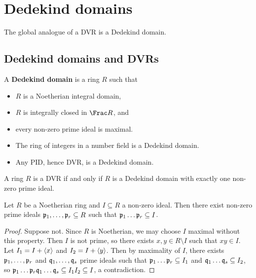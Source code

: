 \pagebreak

\section{Dedekind domains}

The global analogue of a DVR is a Dedekind domain.

\subsection{Dedekind domains and DVRs}

\begin{definition}
A \textbf{Dedekind domain} is a ring $ R $ such that
\begin{itemize}
\item $ R $ is a Noetherian integral domain,
\item $ R $ is integrally closed in $ \Frac R $, and
\item every non-zero prime ideal is maximal.
\end{itemize}
\end{definition}

\begin{example*}
\hfill
\begin{itemize}
\item The ring of integers in a number field is a Dedekind domain.
\item Any PID, hence DVR, is a Dedekind domain.
\end{itemize}
\end{example*}

\begin{theorem}
\label{thm:10.7}
A ring $ R $ is a DVR if and only if $ R $ is a Dedekind domain with exactly one non-zero prime ideal.
\end{theorem}

\begin{lemma}
\label{lem:10.8}
Let $ R $ be a Noetherian ring and $ I \subseteq R $ a non-zero ideal. Then there exist non-zero prime ideals $ \mathfrak{p}_1, \dots, \mathfrak{p}_r \subseteq R $ such that $ \mathfrak{p}_1 \dots \mathfrak{p}_r \subseteq I $.
\end{lemma}

\begin{proof}
Suppose not. Since $ R $ is Noetherian, we may choose $ I $ maximal without this property. Then $ I $ is not prime, so there exists $ x, y \in R \setminus I $ such that $ xy \in I $. Let $ I_1 = I + \left\langle x \right\rangle $ and $ I_2 = I + \left\langle y \right\rangle $. Then by maximality of $ I $, there exists $ \mathfrak{p}_1, \dots, \mathfrak{p}_r $ and $ \mathfrak{q}_1, \dots, \mathfrak{q}_s $ prime ideals such that $ \mathfrak{p}_1 \dots \mathfrak{p}_r \subseteq I_1 $ and $ \mathfrak{q}_1 \dots \mathfrak{q}_s \subseteq I_2 $, so $ \mathfrak{p}_1 \dots \mathfrak{p}_r\mathfrak{q}_1 \dots \mathfrak{q}_s \subseteq I_1I_2 \subseteq I $, a contradiction.
\end{proof}

